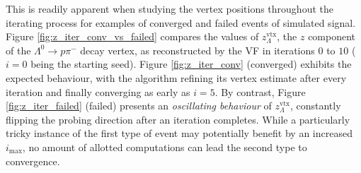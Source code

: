 This is readily apparent when studying the vertex positions throughout the iterating process for examples of converged and failed events of simulated signal.
Figure \ref{fig:z_iter_conv_vs_failed} compares the values of $z_\Lambda^\text{vtx}$, the $z$ component of the $\Lambda^0 \rightarrow p\pi^-$ decay vertex, as reconstructed by the VF in iterations $0$ to $10$ ($i=0$ being the starting seed).
Figure \ref{fig:z_iter_conv} (converged) exhibits the expected behaviour, with the algorithm refining its vertex estimate after every iteration and finally converging as early as $i=5$.
By contrast, Figure \ref{fig:z_iter_failed} (failed) presents an \textit{oscillating behaviour} of $z_\Lambda^\text{vtx}$, constantly flipping the probing direction after an iteration completes.
While a particularly tricky instance of the first type of event may potentially benefit by an increased $i_\text{max}$, no amount of allotted computations can lead the second type to convergence.

